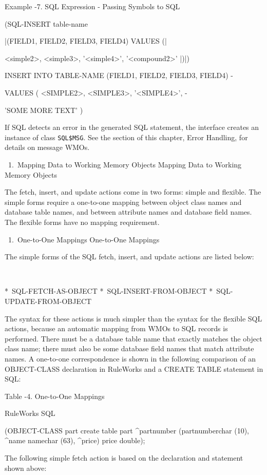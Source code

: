 Example -7. SQL Expression - Passing Symbols to SQL

        (SQL-INSERT table-name

        |(FIELD1, FIELD2, FIELD3, FIELD4) VALUES (|

        <simple2>, <simple3>, '<simple4>',
        '<compound2>' |)|)

        INSERT INTO TABLE-NAME (FIELD1, FIELD2,
        FIELD3, FIELD4) -

        VALUES ( <SIMPLE2>, <SIMPLE3>, '<SIMPLE4>',
        -

        'SOME MORE TEXT' )

        If SQL detects an error in the generated SQL statement, the
        interface creates an instance of class
        \verb|SQL$MSG|. See the section of this chapter, Error
        Handling, for details on message WMOs.

  1. Mapping Data to Working Memory Objects Mapping
     Data to Working Memory Objects

     The fetch, insert, and update actions come in
     two forms: simple and flexible. The simple
     forms require a one-to-one mapping between
     object class names and database table names,
     and between attribute names and database field
     names. The flexible forms have no mapping
     requirement.

       1. One-to-One Mappings One-to-One Mappings

The simple forms of the SQL fetch, insert, and
update actions are listed below:

 

  * SQL-FETCH-AS-OBJECT
  * SQL-INSERT-FROM-OBJECT
  * SQL-UPDATE-FROM-OBJECT

The syntax for these actions is much simpler than
the syntax for the flexible SQL actions, because an
automatic mapping from WMOs to SQL records is
performed. There must be a database table name that
exactly matches the object class name; there must
also be some database field names that match
attribute names. A one-to-one correspondence is
shown in the following comparison of an
OBJECT-CLASS declaration in RuleWorks and a CREATE
TABLE statement in SQL:

Table -4. One-to-One Mappings

     RuleWorks  SQL

     (OBJECT-CLASS part    create table part
     ^partnumber   (partnumberchar (10),
     ^name namechar  (63),
     ^price) price double);

The following simple fetch action is based on the
declaration and statement shown above:

